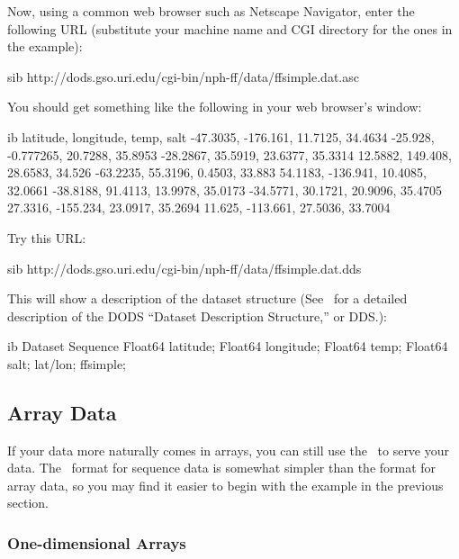 Now, using a common web browser such as Netscape Navigator, enter the
following URL (substitute your machine name and CGI directory for the
ones in the example):

\begin{vcode}{sib}
http://dods.gso.uri.edu/cgi-bin/nph-ff/data/ffsimple.dat.asc
\end{vcode}

You should get something like the following in your web browser's
window:

\begin{vcode}{ib}
latitude, longitude, temp, salt
-47.3035, -176.161, 11.7125, 34.4634
-25.928, -0.777265, 20.7288, 35.8953
-28.2867, 35.5919, 23.6377, 35.3314
12.5882, 149.408, 28.6583, 34.526
-63.2235, 55.3196, 0.4503, 33.883
54.1183, -136.941, 10.4085, 32.0661
-38.8188, 91.4113, 13.9978, 35.0173
-34.5771, 30.1721, 20.9096, 35.4705
27.3316, -155.234, 23.0917, 35.2694
11.625, -113.661, 27.5036, 33.7004
\end{vcode}

Try this URL:

\begin{vcode}{sib}
http://dods.gso.uri.edu/cgi-bin/nph-ff/data/ffsimple.dat.dds
\end{vcode}

This will show a description of the dataset structure (See \DODSuser\ 
for a detailed description of the DODS ``Dataset Description
Structure,'' or DDS.):

\begin{vcode}{ib}
Dataset {
    Sequence {
        Float64 latitude;
        Float64 longitude;
        Float64 temp;
        Float64 salt;
    } lat/lon;
} ffsimple;
\end{vcode}

\subsection{Array Data}

If your data more naturally comes in arrays, you can still use the
\ffs\ to serve your data.  The \ffnd\ format for sequence data is
somewhat simpler than the format for array data, so you may find it
easier to begin with the example in the previous section.


\subsubsection{One-dimensional Arrays}

